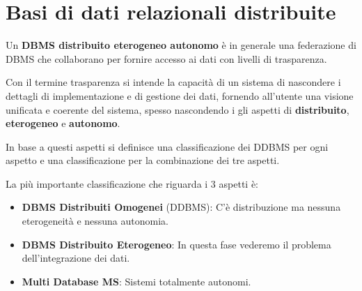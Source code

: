 \chapter{Basi di dati relazionali distribuite}
\begin{definizione}
    Un \textbf{DBMS distribuito eterogeneo autonomo} è in generale una
    federazione di DBMS che collaborano per fornire accesso ai dati con livelli
    di trasparenza.
\end{definizione}
Con il termine trasparenza si intende la capacità di un sistema di
nascondere i dettagli di implementazione e di gestione dei dati, fornendo
all'utente una visione unificata e coerente del sistema, spesso nascondendo i gli
aspetti di \textbf{distribuito}, \textbf{eterogeneo} e \textbf{autonomo}.

In base a questi aspetti si definisce una classificazione dei DDBMS per ogni aspetto
e una classificazione per la combinazione dei tre aspetti.

La più importante classificazione che riguarda i $3$ aspetti è:
\begin{itemize}
    \item \textbf{DBMS Distribuiti Omogenei} (DDBMS): C'è distribuzione ma
          nessuna eterogeneità e nessuna autonomia.
    \item \textbf{DBMS Distribuito Eterogeneo}: In questa fase vederemo il
          problema dell'integrazione dei dati.
    \item \textbf{Multi Database MS}: Sistemi totalmente autonomi.
\end{itemize}

